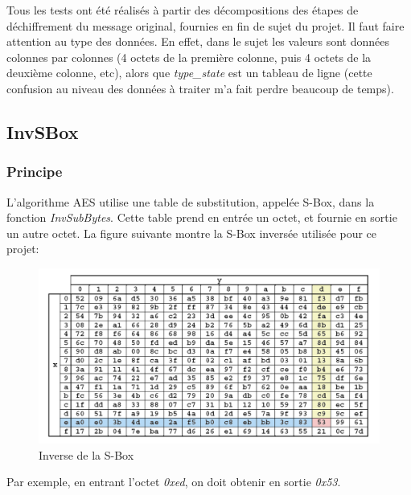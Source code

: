 \documentclass[a4paper, 12pt]{article}
\begin{document}
Tous les tests ont été réalisés à partir des décompositions des étapes de déchiffrement du message original, fournies en fin de sujet du projet. Il faut faire attention au type des données. En effet, dans le sujet les valeurs sont données colonnes par colonnes (4 octets de la première colonne, puis 4 octets de la deuxième colonne, etc), alors que \emph{type\_state} est un tableau de ligne (cette confusion au niveau des données à traiter m'a fait perdre beaucoup de temps).

	\subsection{InvSBox}
		\subsubsection{Principe}
		L'algorithme AES utilise une table de substitution, appelée S-Box, dans la fonction \emph{InvSubBytes}. Cette table prend en entrée un octet, et fournie en sortie un autre octet. La figure suivante montre la S-Box inversée utilisée pour ce projet:
		\begin{figure}[H]
			\begin{center}
			\includegraphics[scale=0.4]{Images/InvSBox.png}
			\end{center}
			\caption{Inverse de la S-Box}
			\label{InvSBox}
		\end{figure}
Par exemple, en entrant l'octet \emph{0xed}, on doit obtenir en sortie \emph{0x53}.
\end{document}
